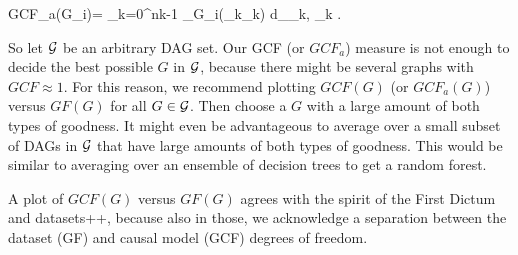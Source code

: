 \beq
GCF_a(G_i)= 
\sum_{k=0}^{nk-1}
\s_{G_i}(\rva_k\text{---}\rvb_k)
d_{\rva_k, \rvb_k}
\;.
\eeq

So let ${\cal G}$
be an arbitrary DAG set.
Our GCF (or $GCF_a$) measure
is not enough to
decide the best 
possible $G$ in ${\cal G}$,
because there might 
be several graphs with 
$GCF\approx 1$.
For this reason,
we recommend
plotting $GCF(G)$ (or $GCF_a(G)$)
versus $GF(G)$
for all $G\in{\cal G}$.
Then  choose a $G$ with a
large amount
of both types of goodness.
It might even be
advantageous to average over
a small subset of DAGs in  ${\cal G}$
that have large amounts of both
types of goodness.
This would be similar to  averaging
over an ensemble of decision trees to get 
a random forest.

A plot of 
$GCF(G)$
versus $GF(G)$
agrees with the spirit of
the First 
Dictum and datasets++,
because also in those,
we acknowledge a separation between the
dataset (GF)  and causal model (GCF) degrees of freedom.

